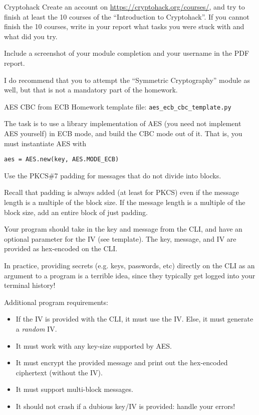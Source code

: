 \documentclass{homework}
\begin{document}
\begin{task}{Cryptohack}
  Create an account on \url{https://cryptohack.org/courses/}, and try to finish at least the 10 courses of the \enquote{Introduction to Cryptohack}.
  If you cannot finish the 10 courses, write in your report what tasks you were stuck with and what did you try.

  Include a screenshot of your module completion and your username in the PDF report.

  I do recommend that you to attempt the \enquote{Symmetric Cryptography} module as well, but that is not a mandatory part of the homework.
\end{task}

\begin{task}{AES CBC from ECB}
  Homework template file: \texttt{aes\_ecb\_cbc\_template.py}

  The task is to use a library implementation of AES (you need not implement AES yourself) in ECB mode, and build the CBC mode out of it.
  That is, you must instantiate AES with
  \begin{center}
    \texttt{aes = AES.new(key, AES.MODE\_ECB)}
  \end{center}
  Use the PKCS\#7 padding for messages that do not divide into blocks.
  \begin{tcolorbox}[title=Padding]
    Recall that padding is always added (at least for PKCS) even if the message length is a multiple of the block size.
    If the message length is a multiple of the block size, add an entire block of just padding.
  \end{tcolorbox}

  Your program should take in the key and message from the CLI, and have an optional parameter for the IV (see template).
  The key, message, and IV are provided as hex-encoded on the CLI.

  \begin{tcolorbox}[title=Note]
    In practice, providing secrets (e.g. keys, passwords, etc) directly on the CLI as an argument to a program is a terrible idea, since they typically get logged into your terminal history!
  \end{tcolorbox}

  Additional program requirements:
  \begin{itemize}
    \item If the IV is provided with the CLI, it must use the IV. Else, it must generate a \emph{random} IV.
    \item It must work with any key-size supported by AES.
    \item It must encrypt the provided message and print out the hex-encoded ciphertext (without the IV).
    \item It must support multi-block messages.
    \item It should not crash if a dubious key/IV is provided: handle your errors!
  \end{itemize}


\end{task}
\end{document}
